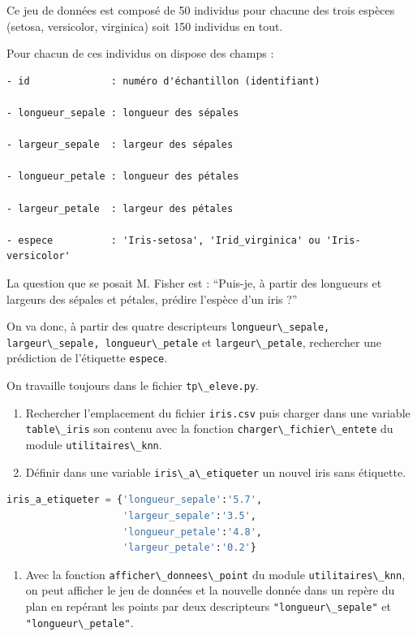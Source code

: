 \documentclass[
  11pt,
]{article}
\newcommand{\passthrough}[1]{#1}
\providecommand{\tightlist}{%
  \setlength{\itemsep}{0pt}\setlength{\parskip}{0pt}}
\newcounter{def}
\begin{document}
Ce jeu de données est composé de 50 individus pour chacune des trois
espèces (setosa, versicolor, virginica) soit 150 individus en tout.

Pour chacun de ces individus on dispose des champs :

\begin{lstlisting}
- id              : numéro d'échantillon (identifiant)  

- longueur_sepale : longueur des sépales  

- largeur_sepale  : largeur des sépales  

- longueur_petale : longueur des pétales  

- largeur_petale  : largeur des pétales  

- espece          : 'Iris-setosa', 'Irid_virginica' ou 'Iris-versicolor'
\end{lstlisting}

La question que se posait M. Fisher est : ``Puis-je, à partir des
longueurs et largeurs des sépales et pétales, prédire l'espèce d'un iris
?''

On va donc, à partir des quatre descripteurs
\passthrough{\lstinline!longueur\_sepale, largeur\_sepale, longueur\_petale!}
et \passthrough{\lstinline!largeur\_petale!}, rechercher une prédiction
de l'étiquette \passthrough{\lstinline!espece!}.

On travaille toujours dans le fichier
\passthrough{\lstinline!tp\_eleve.py!}.

\begin{enumerate}
\def\labelenumi{\arabic{enumi}.}
\item
  Rechercher l'emplacement du fichier \passthrough{\lstinline!iris.csv!}
  puis charger dans une variable \passthrough{\lstinline!table\_iris!}
  son contenu avec la fonction
  \passthrough{\lstinline!charger\_fichier\_entete!} du module
  \passthrough{\lstinline!utilitaires\_knn!}.
\item
  Définir dans une variable \passthrough{\lstinline!iris\_a\_etiqueter!}
  un nouvel iris sans étiquette.
\end{enumerate}

\begin{lstlisting}[language=Python]
iris_a_etiqueter = {'longueur_sepale':'5.7', 
                    'largeur_sepale':'3.5', 
                    'longueur_petale':'4.8', 
                    'largeur_petale':'0.2'}
\end{lstlisting}

\begin{enumerate}
\def\labelenumi{\arabic{enumi}.}
\setcounter{enumi}{2}
\tightlist
\item
  Avec la fonction \passthrough{\lstinline!afficher\_donnees\_point!} du
  module \passthrough{\lstinline!utilitaires\_knn!}, on peut afficher le
  jeu de données et la nouvelle donnée dans un repère du plan en
  repérant les points par deux descripteurs
  \passthrough{\lstinline!"longueur\_sepale"!} et
  \passthrough{\lstinline!"longueur\_petale"!}.
\end{enumerate}
\end{document}
